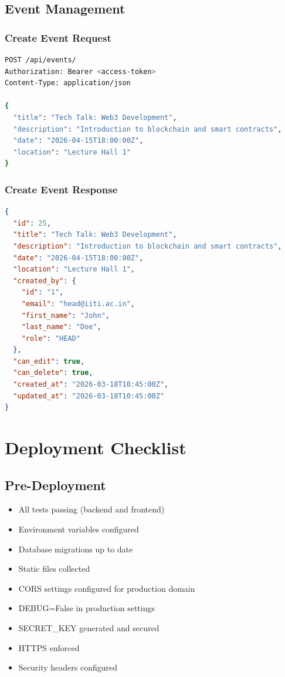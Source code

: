 \documentclass[11pt,a4paper]{article}
\begin{document}
\subsection{Event Management}

\subsubsection{Create Event Request}
\begin{lstlisting}[language=bash]
POST /api/events/
Authorization: Bearer <access-token>
Content-Type: application/json

{
  "title": "Tech Talk: Web3 Development",
  "description": "Introduction to blockchain and smart contracts",
  "date": "2026-04-15T18:00:00Z",
  "location": "Lecture Hall 1"
}
\end{lstlisting}

\subsubsection{Create Event Response}
\begin{lstlisting}[language=JSON]
{
  "id": 25,
  "title": "Tech Talk: Web3 Development",
  "description": "Introduction to blockchain and smart contracts",
  "date": "2026-04-15T18:00:00Z",
  "location": "Lecture Hall 1",
  "created_by": {
    "id": "1",
    "email": "head@iiti.ac.in",
    "first_name": "John",
    "last_name": "Doe",
    "role": "HEAD"
  },
  "can_edit": true,
  "can_delete": true,
  "created_at": "2026-03-18T10:45:00Z",
  "updated_at": "2026-03-18T10:45:00Z"
}
\end{lstlisting}

\section{Deployment Checklist}

\subsection{Pre-Deployment}
\begin{itemize}[leftmargin=*]
    \item[$\square$] All tests passing (backend and frontend)
    \item[$\square$] Environment variables configured
    \item[$\square$] Database migrations up to date
    \item[$\square$] Static files collected
    \item[$\square$] CORS settings configured for production domain
    \item[$\square$] DEBUG=False in production settings
    \item[$\square$] SECRET\_KEY generated and secured
    \item[$\square$] HTTPS enforced
    \item[$\square$] Security headers configured
\end{itemize}
\end{document}
